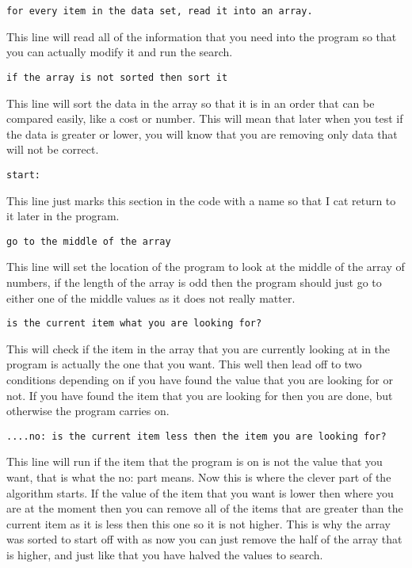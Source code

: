 \documentclass{article}
\begin{document}
\begin{verbatim}
for every item in the data set, read it into an array. 
\end{verbatim}
This line will read all of the information that you need into the program so that you can actually modify it and run the search. 

\begin{verbatim}
if the array is not sorted then sort it
\end{verbatim}
This line will sort the data in the array so that it is in an order that can be compared easily, like a cost or number. This will mean that later when you test if the data is greater or lower, you will know that you are removing only data that will not be correct. 

\begin{verbatim}
start:
\end{verbatim}
This line just marks this section in the code with a name so that I cat return to it later in the program. 

\begin{verbatim}
go to the middle of the array 
\end{verbatim}
This line will set the location of the program to look at the middle of the array of numbers, if the length of the array is odd then the program should just go to either one of the middle values as it does not really matter. 

\begin{verbatim}
is the current item what you are looking for?
\end{verbatim}
This will check if the item in the array that you are currently looking at in the program is actually the one that you want. This well then lead off to two conditions depending on if you have found the value that you are looking for or not. If you have found the item that you are looking for then you are done, but otherwise the program carries on. 

\begin{verbatim}
....no: is the current item less then the item you are looking for?
\end{verbatim}
This line will run if the item that the program is on is not the value that you want, that is what the no: part means. Now this is where the clever part of the algorithm starts. If the value of the item that you want is lower then where you are at the moment then you can remove all of the items that are greater than the current item as it is less then this one so it is not higher. This is why the array was sorted to start off with as now you can just remove the half of the array that is higher, and just like that you have halved the values to search. 
\end{document}
